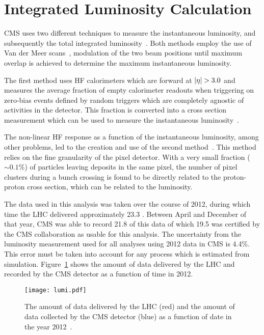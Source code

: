 \section{Integrated Luminosity Calculation}             \label {sec:cms_lumi}
CMS uses two different techniques to measure the instantaneous luminosity,
and subsequently the total integrated luminosity~\cite{lumi11, lumi12,
lumi12up}. Both methods employ the use of Van der Meer scans~\cite{vdm},
modulation of the two beam positions until maximum overlap is achieved to
determine the maximum instantaneous luminosity.

The first method uses HF calorimeters which are forward at $\left|\eta\right|
> 3.0$ and measures the average fraction of empty calorimeter readouts when
triggering on zero-bias events defined by random triggers which are completely
agnostic of activities in the detector. This fraction is converted into a
cross section measurement which can be used to measure the instantaneous
luminosity~\cite{lumi11}.

The non-linear HF response as a function of the instantaneous luminosity, among
other problems, led to the creation and use of the second method~\cite{lumi12,
lumi12up}. This method relies on the fine granularity of the pixel detector.
With a very small fraction ($\sim 0.1\%$) of particles leaving deposits in the
same pixel, the number of pixel clusters during a bunch crossing is found to
be directly related to the proton-proton cross section, which can be related to
the luminosity.

The data used in this analysis was taken over the course of 2012, during which
time the LHC delivered approximately 23.3 \fbinv. Between April and December
of that year, CMS was able to record 21.8 \fbinv of this data of which 19.5
\fbinv was certified by the CMS collaboration as usable for this analysis. The
uncertainty from the luminosity measurement used for all analyses using 2012
data in CMS is 4.4\%. This error must be taken into account for any process
which is estimated from simulation. Figure~\ref{fig:cms_lumi} shows the amount
of data delivered by the LHC and recorded by the CMS detector as a function of
time in 2012.
\begin{figure}[!tbh]
\begin{center}
\texttt{[image: lumi.pdf]}
\caption[Summary of the amount of data delivered by the LHC and collected by CMS in 2012]
{\label{fig:cms_lumi}
The amount of data delivered by the LHC (red) and the amount of data
collected by the CMS detector (blue) as a function of date in the year 2012~\cite{lumitwiki}.
}
\end{center}
\end{figure}

